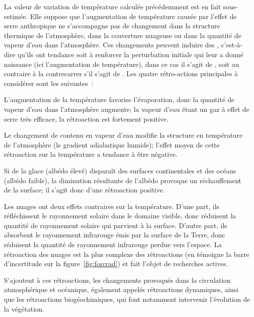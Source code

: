 \sk
La valeur de variation de température calculée précédemment est en fait sous-estimée. Elle suppose que l'augmentation de température causée par l'effet de serre anthropique ne s'accompagne pas de changement dans la structure thermique de l'atmosphère, dans la couverture nuageuse ou dans la quantité de vapeur d'eau dans l'atmosphère. Ces changements peuvent induire des , c'est-à-dire qu'ils ont tendance soit à renforcer la perturbation initiale qui leur a donné naissance (ici l'augmentation de température), dans ce cas il s'agit de , soit au contraire à la contrecarrer s'il s'agit de . Les quatre rétro-actions principales à considérer sont les suivantes~:
\begin{finger}
\item L'augmentation de la température favorise l'évaporation, donc la quantité de vapeur d'eau dans l'atmosphère augmente; la vapeur d'eau étant un gaz à effet de serre très efficace, la rétroaction est fortement positive.
\item Le changement de contenu en vapeur d'eau modifie la structure en température de l'atmosphère (le gradient adiabatique humide); l'effet moyen de cette rétroaction sur la température a tendance à être négative.
\item Si de la glace (albédo élevé) disparaît des surfaces continentales et des océans (albédo faible), la diminution résultante de l'albédo provoque un réchauffement de la surface; il s'agit donc d'une rétroaction positive.
\item Les nuages ont deux effets contraires sur la température. D'une part, ils réfléchissent le rayonnement solaire dans le domaine visible, donc réduisent la quantité de rayonnement solaire qui parvient à la surface. D'autre part, ils absorbent le rayonnement infrarouge émis par la surface de la Terre, donc réduisent la quantité de rayonnement infrarouge perdue vers l'espace. La rétroaction des nuages est la plus complexe des rétroactions (en témoigne la barre d'incertitude sur la figure~\ref{fig:forcrad}) et fait l'objet de recherches actives.
\end{finger}
S'ajoutent à ces rétroactions, les changements provoqués dans la circulation atmosphérique et océanique, également appelés rétroactions dynamiques, ainsi que les rétroactions biogéochimiques, qui font notamment intervenir l'évolution de la végétation. 

